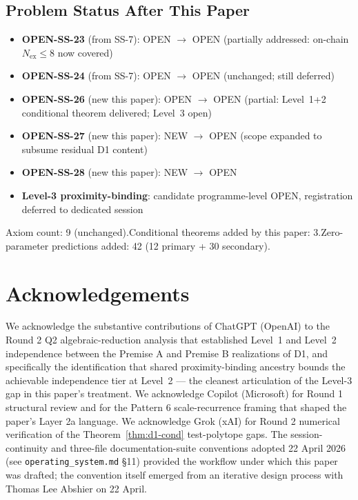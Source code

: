 \documentclass[11pt,letterpaper]{article}
\theoremstyle{definition}
\newcommand{\Nex}{N_{\text{ex}}}
\begin{document}
\subsection{Problem Status After This Paper}
\label{sec:problem-status}

\begin{itemize}
  \item \textbf{OPEN-SS-23} (from SS-7): OPEN $\to$ OPEN (partially addressed: on-chain $\Nex \leq 8$ now covered)
  \item \textbf{OPEN-SS-24} (from SS-7): OPEN $\to$ OPEN (unchanged; still deferred)
  \item \textbf{OPEN-SS-26} (new this paper): OPEN $\to$ OPEN (partial: Level~1+2 conditional theorem delivered; Level~3 open)
  \item \textbf{OPEN-SS-27} (new this paper): NEW $\to$ OPEN (scope expanded to subsume residual D1 content)
  \item \textbf{OPEN-SS-28} (new this paper): NEW $\to$ OPEN
  \item \textbf{Level-3 proximity-binding}: candidate programme-level OPEN, registration deferred to dedicated session
\end{itemize}

Axiom count: 9 (unchanged).\quad Conditional theorems added by this paper: 3.\quad Zero-parameter predictions added: 42 (12 primary + 30 secondary).

\section*{Acknowledgements}

We acknowledge the substantive contributions of ChatGPT (OpenAI) to the Round 2 Q2 algebraic-reduction analysis that established Level~1 and Level~2 independence between the Premise A and Premise B realizations of D1, and specifically the identification that shared proximity-binding ancestry bounds the achievable independence tier at Level~2 --- the cleanest articulation of the Level-3 gap in this paper's treatment. We acknowledge Copilot (Microsoft) for Round 1 structural review and for the Pattern 6 scale-recurrence framing that shaped the paper's Layer 2a language. We acknowledge Grok (xAI) for Round 2 numerical verification of the Theorem~\ref{thm:d1-cond} test-polytope gaps. The session-continuity and three-file documentation-suite conventions adopted 22 April 2026 (see \texttt{operating\_system.md} \S11) provided the workflow under which this paper was drafted; the convention itself emerged from an iterative design process with Thomas Lee Abshier on 22 April.
\end{document}
